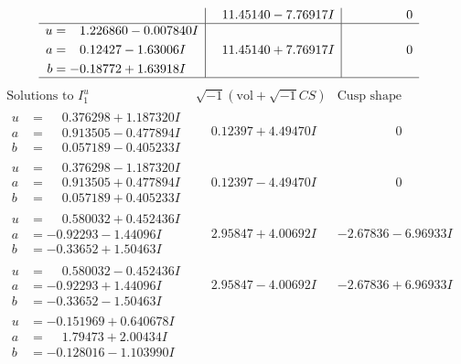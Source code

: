 \documentclass[1p]{elsarticle_modified}
\theoremstyle{definition}
\newcommand{\I}{\sqrt{-1}}
\begin{document}
$$\begin{array}{c|c|c}
 & \phantom{-}11.45140 - 7.76917 I & \phantom{-0.000000 } 0 \\ \hline\begin{aligned}
u &= \phantom{-}1.226860 - 0.007840 I \\
a &= \phantom{-}0.12427 - 1.63006 I \\
b &= -0.18772 + 1.63918 I\end{aligned}
 & \phantom{-}11.45140 + 7.76917 I & \phantom{-0.000000 } 0\\
 \hline 
 \end{array}$$\newpage$$\begin{array}{c|c|c}  
\text{Solutions to }I^u_{1}& \I (\text{vol} + \sqrt{-1}CS) & \text{Cusp shape}\\
 \hline 
\begin{aligned}
u &= \phantom{-}0.376298 + 1.187320 I \\
a &= \phantom{-}0.913505 - 0.477894 I \\
b &= \phantom{-}0.057189 - 0.405233 I\end{aligned}
 & \phantom{-}0.12397 + 4.49470 I & \phantom{-0.000000 } 0 \\ \hline\begin{aligned}
u &= \phantom{-}0.376298 - 1.187320 I \\
a &= \phantom{-}0.913505 + 0.477894 I \\
b &= \phantom{-}0.057189 + 0.405233 I\end{aligned}
 & \phantom{-}0.12397 - 4.49470 I & \phantom{-0.000000 } 0 \\ \hline\begin{aligned}
u &= \phantom{-}0.580032 + 0.452436 I \\
a &= -0.92293 - 1.44096 I \\
b &= -0.33652 + 1.50463 I\end{aligned}
 & \phantom{-}2.95847 + 4.00692 I & -2.67836 - 6.96933 I \\ \hline\begin{aligned}
u &= \phantom{-}0.580032 - 0.452436 I \\
a &= -0.92293 + 1.44096 I \\
b &= -0.33652 - 1.50463 I\end{aligned}
 & \phantom{-}2.95847 - 4.00692 I & -2.67836 + 6.96933 I \\ \hline\begin{aligned}
u &= -0.151969 + 0.640678 I \\
a &= \phantom{-}1.79473 + 2.00434 I \\
b &= -0.128016 - 1.103990 I\end{aligned}

\end{array}$$
\end{document}
